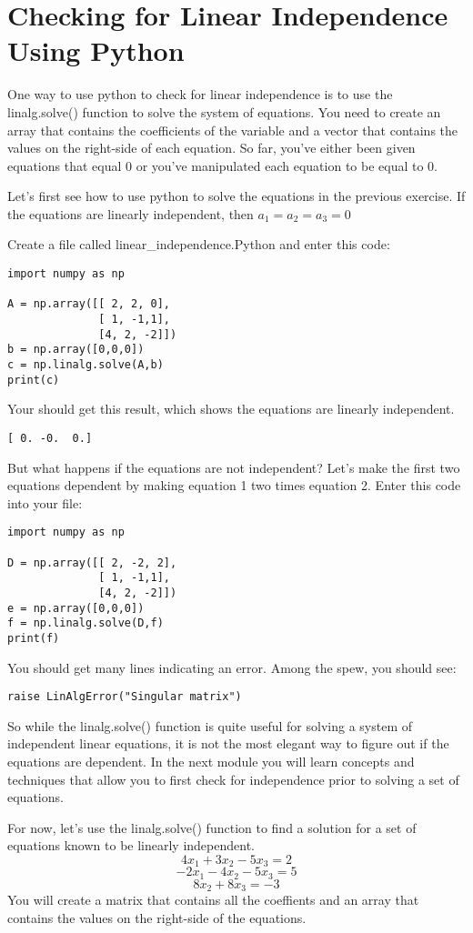 \section{Checking for Linear Independence Using Python}  
One way to use python to check for linear independence is to use the linalg.solve() function to solve the system of equations. You need to create an array that contains the coefficients of the variable and a vector that contains the values on the right-side of each equation. So far, you've either been given equations that equal 0 or you've manipulated each equation to be equal to 0. 

Let's first see how to use python to solve the equations in the previous exercise. If the equations are linearly independent, then $a_1 = a_2 = a_3 = 0$

Create a file called linear\_independence.Python and enter this code:
\begin{Verbatim}
import numpy as np

A = np.array([[ 2, 2, 0], 
              [ 1, -1,1],
              [4, 2, -2]])
b = np.array([0,0,0])
c = np.linalg.solve(A,b)
print(c)
\end{Verbatim}
Your should get this result, which shows the equations are linearly independent.
\begin{Verbatim}
[ 0. -0.  0.]
\end{Verbatim}
But what happens if the equations are not independent? Let's make the first two equations dependent by making equation 1 two times equation 2. Enter this code into your file:
\begin{Verbatim}
import numpy as np

D = np.array([[ 2, -2, 2], 
              [ 1, -1,1],
              [4, 2, -2]])
e = np.array([0,0,0])
f = np.linalg.solve(D,f)
print(f)
\end{Verbatim}
You should get many lines indicating an error. Among the spew, you should see:
\begin{Verbatim}
raise LinAlgError("Singular matrix")
\end{Verbatim}
So while the linalg.solve() function is quite useful for solving a system of independent linear equations, it is not the most elegant way to figure out if the equations are dependent. In the next module you will learn concepts and techniques that allow you to first check for independence prior to solving a set of equations. 

For now, let's use the  linalg.solve() function to find a solution for a set of equations known to be linearly independent.
$$4x_1 + 3x_2 - 5x_3 = 2$$
$$-2x_1- 4x_2 - 5x_3 = 5$$
$$       8x_2 + 8x_3  = -3$$
You will create a matrix that contains all the coeffients and an array that contains the values on the right-side of the equations. 


